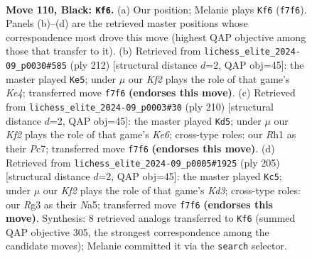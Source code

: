 \documentclass[11pt]{article}
\begin{document}
\clearpage

\begin{figure}[p]\centering
\begin{subfigure}{0.46\textwidth}\centering
\resizebox{\linewidth}{!}{%
\newchessgame
\chessboard[
  setfen={8/3R1k2/8/8/8/6r1/4K3/7r b - - 31 110},
  showmover=false,
  pgfstyle=straightmove, color=movearrow, markmove={f7-f6}
]}
\caption{}
\end{subfigure}\hfill
\begin{subfigure}{0.46\textwidth}\centering
\resizebox{\linewidth}{!}{%
\newchessgame
\chessboard[
  setfen={8/8/8/8/4K2r/8/6k1/3R4 w - - 29 107},
  showmover=false,
  pgfstyle=straightmove, color=movearrow, markmove={e4-e5}
]}
\caption{}
\end{subfigure}
\\[4pt]
\begin{subfigure}{0.46\textwidth}\centering
\resizebox{\linewidth}{!}{%
\newchessgame
\chessboard[
  setfen={k7/2P5/4K2r/8/1R6/8/8/8 w - - 21 106},
  showmover=false,
  pgfstyle=straightmove, color=movearrow, markmove={e6-d5}
]}
\caption{}
\end{subfigure}\hfill
\begin{subfigure}{0.46\textwidth}\centering
\resizebox{\linewidth}{!}{%
\newchessgame
\chessboard[
  setfen={8/8/3k4/n7/8/3R4/7r/4K3 b - - 93 103},
  showmover=false,
  pgfstyle=straightmove, color=movearrow, markmove={d6-c5}
]}
\caption{}
\end{subfigure}
\caption{\textbf{Move 110, Black: \texttt{Kf6}.} (a) Our position; Melanie plays \texttt{Kf6} (\texttt{f7f6}). Panels (b)--(d) are the retrieved master positions whose correspondence most drove this move (highest QAP objective among those that transfer to it). (b) Retrieved from \texttt{lichess\_elite\_2024-09\_p0030\#585} (ply 212) [structural distance $d$=2, QAP obj=45]: the master played \texttt{Ke5}; under $\mu$ our \emph{Kf2} plays the role of that game's \emph{Ke4}; transferred move \texttt{f7f6} \textbf{(endorses this move)}. (c) Retrieved from \texttt{lichess\_elite\_2024-09\_p0003\#30} (ply 210) [structural distance $d$=2, QAP obj=45]: the master played \texttt{Kd5}; under $\mu$ our \emph{Kf2} plays the role of that game's \emph{Ke6}; cross-type roles: our \emph{R}h1 as their \emph{P}c7; transferred move \texttt{f7f6} \textbf{(endorses this move)}. (d) Retrieved from \texttt{lichess\_elite\_2024-09\_p0005\#1925} (ply 205) [structural distance $d$=2, QAP obj=45]: the master played \texttt{Kc5}; under $\mu$ our \emph{Kf2} plays the role of that game's \emph{Kd3}; cross-type roles: our \emph{R}g3 as their \emph{N}a5; transferred move \texttt{f7f6} \textbf{(endorses this move)}. Synthesis: 8 retrieved analogs transferred to \texttt{Kf6} (summed QAP objective 305, the strongest correspondence among the candidate moves); Melanie committed it via the \texttt{search} selector.}
\label{fig:thought-m219}
\end{figure}
\end{document}
